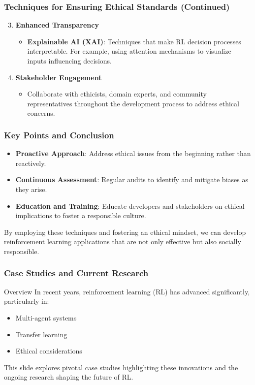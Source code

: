\documentclass[aspectratio=169]{beamer}
\begin{document}
\begin{frame}[fragile]
    \frametitle{Techniques for Ensuring Ethical Standards (Continued)}
    \begin{enumerate}
        \setcounter{enumi}{2} %
        \item \textbf{Enhanced Transparency}
        \begin{itemize}
            \item \textbf{Explainable AI (XAI)}: Techniques that make RL decision processes interpretable. For example, using attention mechanisms to visualize inputs influencing decisions.
        \end{itemize}
        
        \item \textbf{Stakeholder Engagement}
        \begin{itemize}
            \item Collaborate with ethicists, domain experts, and community representatives throughout the development process to address ethical concerns.
        \end{itemize}
    \end{enumerate}
\end{frame}

\begin{frame}[fragile]
    \frametitle{Key Points and Conclusion}
    \begin{itemize}
        \item \textbf{Proactive Approach}: Address ethical issues from the beginning rather than reactively.
        \item \textbf{Continuous Assessment}: Regular audits to identify and mitigate biases as they arise.
        \item \textbf{Education and Training}: Educate developers and stakeholders on ethical implications to foster a responsible culture.
    \end{itemize}
    
    By employing these techniques and fostering an ethical mindset, we can develop reinforcement learning applications that are not only effective but also socially responsible.
\end{frame}

\begin{frame}[fragile]
    \frametitle{Case Studies and Current Research}
    \begin{block}{Overview}
        In recent years, reinforcement learning (RL) has advanced significantly, particularly in:
        \begin{itemize}
            \item Multi-agent systems
            \item Transfer learning
            \item Ethical considerations
        \end{itemize}
        This slide explores pivotal case studies highlighting these innovations and the ongoing research shaping the future of RL.
    \end{block}
\end{frame}
\end{document}
